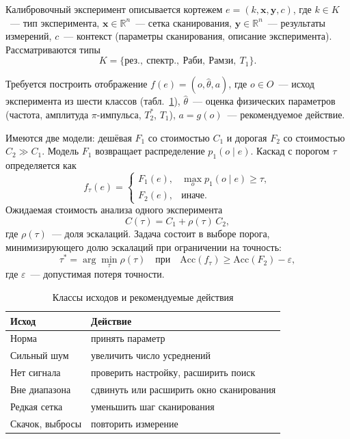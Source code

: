 \documentclass{misisarticle}
\begin{document}
Калибровочный эксперимент описывается кортежем $e = (k, \mathbf{x}, \mathbf{y}, c)$, где $k \in K$~--- тип эксперимента, $\mathbf{x} \in \mathbb{R}^n$~--- сетка сканирования, $\mathbf{y} \in \mathbb{R}^n$~--- результаты измерений, $c$~--- контекст (параметры сканирования, описание эксперимента). Рассматриваются типы
\[
  K = \{\text{рез.}, \ \text{спектр.}, \ \text{Раби}, \ \text{Рамзи}, \ T_1\}.
\]

Требуется построить отображение $f(e) = (o, \hat{\theta}, a)$, где $o \in O$~--- исход эксперимента из шести классов (табл.~\ref{tab:classes}), $\hat{\theta}$~--- оценка физических параметров (частота, амплитуда $\pi$-импульса, $T_2^*$, $T_1$), $a = g(o)$~--- рекомендуемое действие.

Имеются две модели: дешёвая $F_1$ со стоимостью $C_1$ и дорогая $F_2$ со стоимостью $C_2 \gg C_1$. Модель $F_1$ возвращает распределение $p_1(o \mid e)$. Каскад с порогом $\tau$ определяется как
\begin{equation}
  f_\tau(e) =
  \begin{cases}
    F_1(e), & \max_{o} p_1(o \mid e) \geq \tau, \\
    F_2(e), & \text{иначе}.
  \end{cases}
  \label{eq:cascade}
\end{equation}
Ожидаемая стоимость анализа одного эксперимента
\begin{equation}
  C(\tau) = C_1 + \rho(\tau)\, C_2,
  \label{eq:cost}
\end{equation}
где $\rho(\tau)$~--- доля эскалаций. Задача состоит в выборе порога, минимизирующего долю эскалаций при ограничении на точность:
\begin{equation}
  \tau^* = \arg\min_{\tau} \rho(\tau) \quad \text{при} \quad \mathrm{Acc}(f_\tau) \geq \mathrm{Acc}(F_2) - \varepsilon,
  \label{eq:objective}
\end{equation}
где $\varepsilon$~--- допустимая потеря точности.

\begin{table}[htbp]
  \caption{Классы исходов и рекомендуемые действия}
  \label{tab:classes}
  \centering
  \small
  \begin{tabular}{p{}p{}}
    \toprule
    \textbf{Исход} & \textbf{Действие} \\
    \toprule
    Норма & принять параметр \\
    Сильный шум & увеличить число усреднений \\
    Нет сигнала & проверить настройку, расширить поиск \\
    Вне диапазона & сдвинуть или расширить окно сканирования \\
    Редкая сетка & уменьшить шаг сканирования \\
    Скачок, выбросы & повторить измерение \\
    \bottomrule
  \end{tabular}
\end{table}
\end{document}
